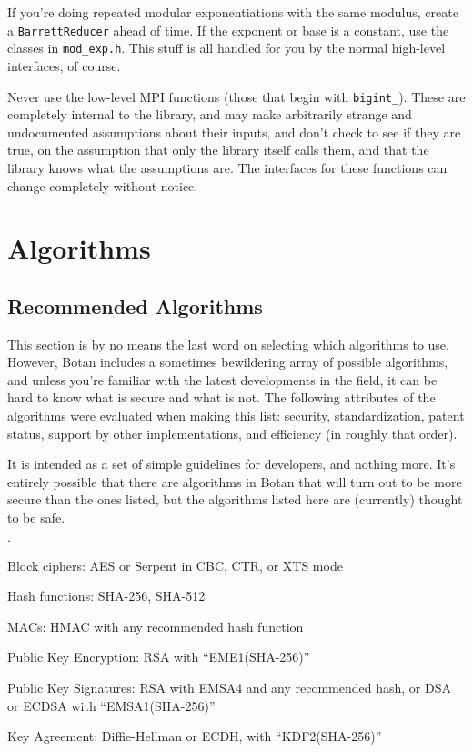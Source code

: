 \documentclass{article}
\newcommand{\filename}[1]{\texttt{#1}}
\newcommand{\type}[1]{\texttt{#1}}
\begin{document}
If you're doing repeated modular exponentiations with the same modulus, create
a \type{BarrettReducer} ahead of time. If the exponent or base is a constant,
use the classes in \filename{mod\_exp.h}. This stuff is all handled for you by
the normal high-level interfaces, of course.

Never use the low-level MPI functions (those that begin with
\texttt{bigint\_}). These are completely internal to the library, and
may make arbitrarily strange and undocumented assumptions about their
inputs, and don't check to see if they are true, on the assumption
that only the library itself calls them, and that the library knows
what the assumptions are. The interfaces for these functions can
change completely without notice.

\section{Algorithms}

\subsection{Recommended Algorithms}

This section is by no means the last word on selecting which
algorithms to use.  However, Botan includes a sometimes bewildering
array of possible algorithms, and unless you're familiar with the
latest developments in the field, it can be hard to know what is
secure and what is not. The following attributes of the algorithms
were evaluated when making this list: security, standardization,
patent status, support by other implementations, and efficiency (in
roughly that order).

It is intended as a set of simple guidelines for developers, and
nothing more.  It's entirely possible that there are algorithms in
Botan that will turn out to be more secure than the ones listed, but
the algorithms listed here are (currently) thought to be safe.

\begin{list}{$\cdot$}
  \item Block ciphers: AES or Serpent in CBC, CTR, or XTS mode

  \item Hash functions: SHA-256, SHA-512

  \item MACs: HMAC with any recommended hash function

  \item Public Key Encryption: RSA with ``EME1(SHA-256)''

  \item Public Key Signatures: RSA with EMSA4 and any recommended
    hash, or DSA or ECDSA with ``EMSA1(SHA-256)''

  \item Key Agreement: Diffie-Hellman or ECDH, with ``KDF2(SHA-256)''
\end{list}
\end{document}
